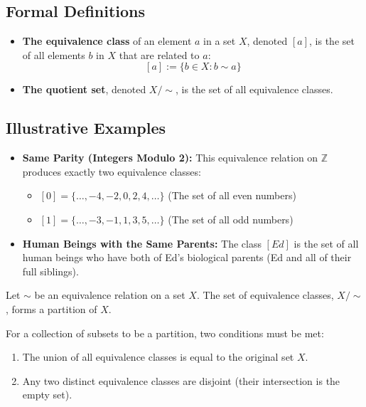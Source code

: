 \subsection*{Formal Definitions}
\begin{itemize}
    \item \textbf{The equivalence class} of an element $a$ in a set $X$, denoted $[a]$, is the set of all elements $b$ in $X$ that are related to $a$:
    $$ [a] := \{b \in X : b \sim a\} $$
    \item \textbf{The quotient set}, denoted $X/\sim$, is the set of all equivalence classes.
\end{itemize}

\subsection*{Illustrative Examples}
\begin{itemize}
    \item \textbf{Same Parity (Integers Modulo 2):} This equivalence relation on $\mathbb{Z}$ produces exactly two equivalence classes:
    \begin{itemize}
        \item $[0] = \{\dots, -4, -2, 0, 2, 4, \dots\}$ (The set of all even numbers)
        \item $[1] = \{\dots, -3, -1, 1, 3, 5, \dots\}$ (The set of all odd numbers)
    \end{itemize}
    \item \textbf{Human Beings with the Same Parents:} The class $[Ed]$ is the set of all human beings who have both of Ed's biological parents (Ed and all of their full siblings).
\end{itemize}

\begin{proposition}
Let $\sim$ be an equivalence relation on a set $X$. The set of equivalence classes, $X/\sim$, forms a partition of $X$.
\end{proposition}
For a collection of subsets to be a partition, two conditions must be met:
\begin{enumerate}
    \item The union of all equivalence classes is equal to the original set $X$.
    \item Any two distinct equivalence classes are disjoint (their intersection is the empty set).
\end{enumerate}

